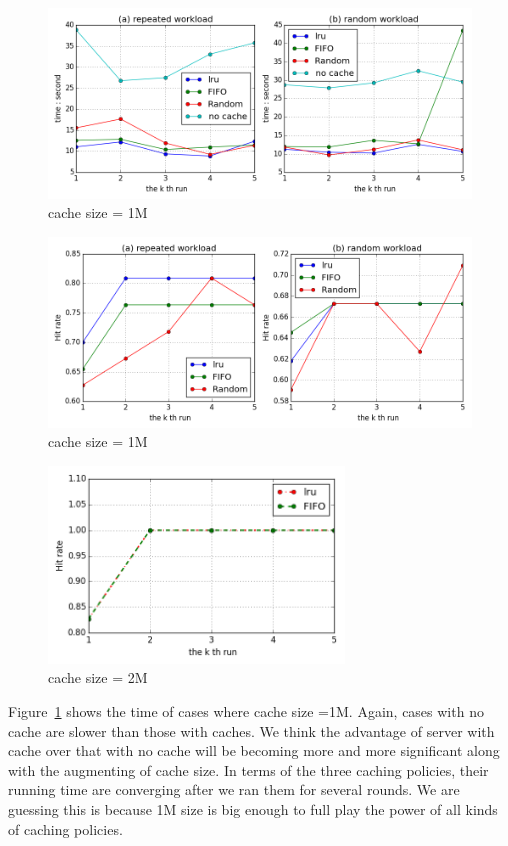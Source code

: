 \documentclass[paper=a4, fontsize=11pt]{scrartcl} %
\numberwithin{equation}{section} %
\numberwithin{figure}{section} %
\numberwithin{table}{section} %
\begin{document}
\begin{figure}[h]
  \centering
  \includegraphics[width=\textwidth]{../data/time1M}
  \caption{cache size = 1M}
  \label{fig:time1M}
\end{figure}
\begin{figure}[h]
  \centering
  \includegraphics[width=\textwidth]{../data/hit1M}
  \caption{cache size = 1M}
  \label{fig:hit1M}
\end{figure}
\begin{figure}[h]
  \centering
  \includegraphics[width=0.7\textwidth]{../data/hit2M}
  \caption{cache size = 2M}
  \label{fig:hit2M}
\end{figure}
Figure~\ref{fig:time1M} shows the time of cases where cache size =1M. Again, cases with no cache are slower than those with caches. We think the advantage of server with cache over that with no cache will be becoming more and more significant along with the augmenting of cache size. In terms of the three caching policies, their running time are converging after we ran them for several rounds. We are guessing this is because 1M size is big enough to full play the power of all kinds of caching policies.
\end{document}
